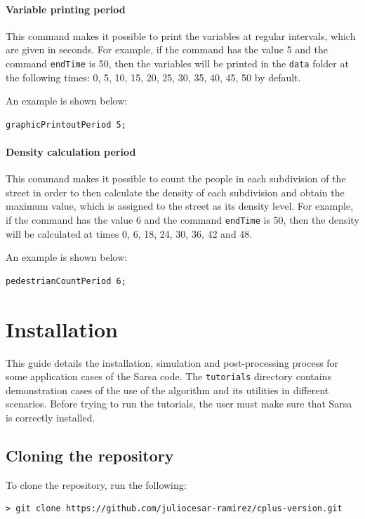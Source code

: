 \documentclass[12pt,a4paper]{book}
\begin{document}
\subsubsection*{Variable printing period}
This command makes it possible to print the variables at regular intervals, which are given in
seconds. For example, if the command has the value 5 and the command \texttt{endTime} is 50, then
the variables will be printed in the \texttt{data} folder at the following times: 0, 5, 10, 15, 20,
25, 30, 35, 40, 45, 50 by default.

An example is shown below:
\begin{lstlisting}[style=control]
graphicPrintoutPeriod 5;
\end{lstlisting}

\subsubsection*{Density calculation period}
This command makes it possible to count the people in each subdivision of the street in order to
then calculate the density of each subdivision and obtain the maximum value, which is assigned to
the street as its density level. For example, if the command has the value 6 and the command
\texttt{endTime} is 50, then the density will be calculated at times 0, 6, 18, 24, 30, 36, 42 and
48.

An example is shown below:
\begin{lstlisting}[style=control]
pedestrianCountPeriod 6;
\end{lstlisting}

\chapter{Installation}

This guide details the installation, simulation and post-processing process for some application
cases of the Sarsa code. The \texttt{tutorials} directory contains demonstration cases of the use of the
algorithm and its utilities in different scenarios. Before trying to run the tutorials, the user
must make sure that Sarsa is correctly installed.

\section{Cloning the repository}
To clone the repository, run the following:
\begin{lstlisting}[style=shell]
> git clone https://github.com/juliocesar-ramirez/cplus-version.git
\end{lstlisting}
\end{document}
